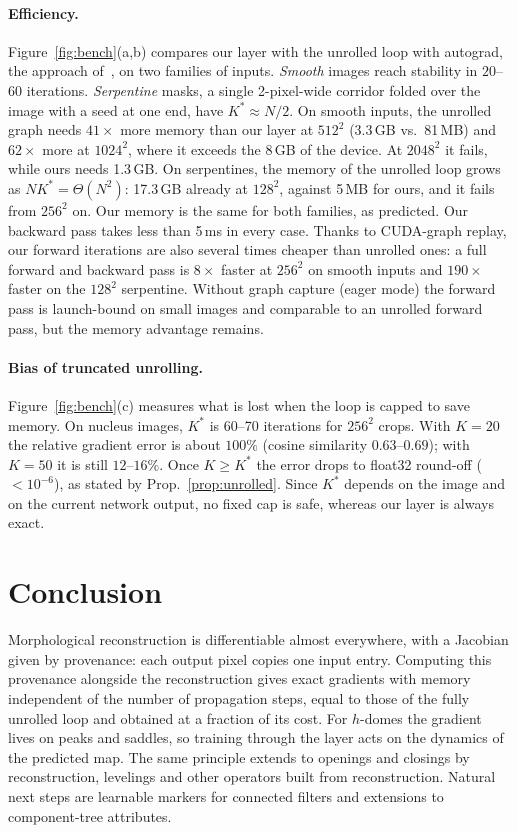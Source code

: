 \documentclass[runningheads]{llncs}
\begin{document}
\paragraph{Efficiency.} Figure~\ref{fig:bench}(a,b) compares our layer with the unrolled loop with autograd, the approach of~\cite{liu2024,blusseau2025}, on two families of inputs. \emph{Smooth} images reach stability in $20$--$60$ iterations. \emph{Serpentine} masks, a single 2-pixel-wide corridor folded over the image with a seed at one end, have $K^\ast\approx N/2$. On smooth inputs, the unrolled graph needs $41\times$ more memory than our layer at $512^2$ (3.3\,GB vs.\ 81\,MB) and $62\times$ more at $1024^2$, where it exceeds the 8\,GB of the device. At $2048^2$ it fails, while ours needs 1.3\,GB. On serpentines, the memory of the unrolled loop grows as $NK^\ast=\Theta(N^2)$: 17.3\,GB already at $128^2$, against 5\,MB for ours, and it fails from $256^2$ on. Our memory is the same for both families, as predicted. Our backward pass takes less than 5\,ms in every case. Thanks to CUDA-graph replay, our forward iterations are also several times cheaper than unrolled ones: a full forward and backward pass is $8\times$ faster at $256^2$ on smooth inputs and $190\times$ faster on the $128^2$ serpentine. Without graph capture (eager mode) the forward pass is launch-bound on small images and comparable to an unrolled forward pass, but the memory advantage remains.

\paragraph{Bias of truncated unrolling.} Figure~\ref{fig:bench}(c) measures what is lost when the loop is capped to save memory. On nucleus images, $K^\ast$ is 60--70 iterations for $256^2$ crops. With $K=20$ the relative gradient error is about $100\%$ (cosine similarity $0.63$--$0.69$); with $K=50$ it is still $12$--$16\%$. Once $K\ge K^\ast$ the error drops to float32 round-off ($<10^{-6}$), as stated by Prop.~\ref{prop:unrolled}. Since $K^\ast$ depends on the image and on the current network output, no fixed cap is safe, whereas our layer is always exact.


\section{Conclusion}
Morphological reconstruction is differentiable almost everywhere, with a Jacobian given by provenance: each output pixel copies one input entry. Computing this provenance alongside the reconstruction gives exact gradients with memory independent of the number of propagation steps, equal to those of the fully unrolled loop and obtained at a fraction of its cost. For $h$-domes the gradient lives on peaks and saddles, so training through the layer acts on the dynamics of the predicted map. The same principle extends to openings and closings by reconstruction, levelings and other operators built from reconstruction. Natural next steps are learnable markers for connected filters and extensions to component-tree attributes.



\end{document}
